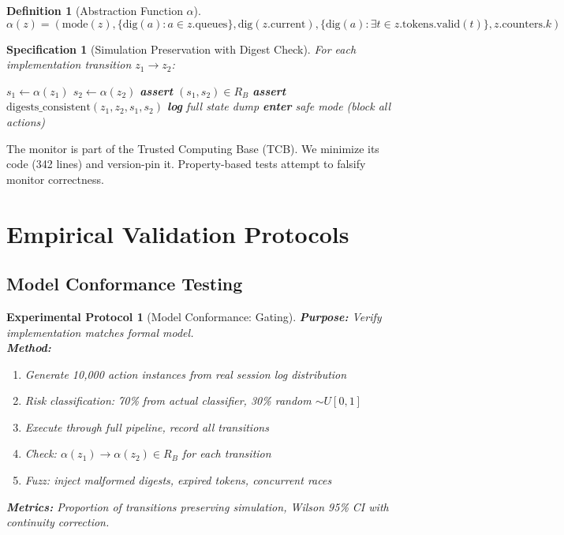 \documentclass[12pt]{article}
\newtheorem{definition}{Definition}[section]
\newtheorem{spec}{Specification}[section]
\newtheorem{protocol}{Experimental Protocol}[section]
\begin{document}
\begin{definition}[Abstraction Function $\alpha$]
\[
\alpha(z) = (\text{mode}(z), \{\mathrm{dig}(a): a \in z.\text{queues}\}, 
             \mathrm{dig}(z.\text{current}), 
             \{\mathrm{dig}(a): \exists t \in z.\text{tokens}.\text{valid}(t)\}, 
             z.\text{counters}.k)
\]
\end{definition}

\begin{spec}[Simulation Preservation with Digest Check]
For each implementation transition $z_1 \to z_2$:
\begin{algorithmic}[1]
\STATE $s_1 \gets \alpha(z_1)$
\STATE $s_2 \gets \alpha(z_2)$
\STATE \textbf{assert} $(s_1, s_2) \in R_B$ 
\STATE \textbf{assert} $\text{digests\_consistent}(z_1, z_2, s_1, s_2)$
    \STATE \textbf{log} full state dump
    \STATE \textbf{enter} safe mode (block all actions)
\ENDIF
\end{algorithmic}
\end{spec}

\begin{remark}
The monitor is part of the Trusted Computing Base (TCB). We minimize its code (342 lines) and version-pin it. Property-based tests attempt to falsify monitor correctness.
\end{remark}

\section{Empirical Validation Protocols}

\subsection{Model Conformance Testing}

\begin{protocol}[Model Conformance: Gating]
\textbf{Purpose:} Verify implementation matches formal model.\\
\textbf{Method:}
\begin{enumerate}
    \item Generate 10,000 action instances from real session log distribution
    \item Risk classification: 70\% from actual classifier, 30\% random $\sim U[0,1]$
    \item Execute through full pipeline, record all transitions
    \item Check: $\alpha(z_1) \to \alpha(z_2) \in R_B$ for each transition
    \item Fuzz: inject malformed digests, expired tokens, concurrent races
\end{enumerate}
\textbf{Metrics:} Proportion of transitions preserving simulation, Wilson 95\% CI with continuity correction.
\end{protocol}
\end{document}
